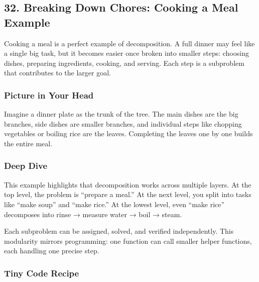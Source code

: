 \documentclass[
  letterpaper,
  DIV=11,
  numbers=noendperiod]{scrreprt}
\begin{document}
\subsection{32. Breaking Down Chores: Cooking a Meal
Example}\label{breaking-down-chores-cooking-a-meal-example}

Cooking a meal is a perfect example of decomposition. A full dinner may
feel like a single big task, but it becomes easier once broken into
smaller steps: choosing dishes, preparing ingredients, cooking, and
serving. Each step is a subproblem that contributes to the larger goal.

\subsubsection{Picture in Your Head}\label{picture-in-your-head-31}

Imagine a dinner plate as the trunk of the tree. The main dishes are the
big branches, side dishes are smaller branches, and individual steps
like chopping vegetables or boiling rice are the leaves. Completing the
leaves one by one builds the entire meal.

\subsubsection{Deep Dive}\label{deep-dive-1}

This example highlights that decomposition works across multiple layers.
At the top level, the problem is ``prepare a meal.'' At the next level,
you split into tasks like ``make soup'' and ``make rice.'' At the lowest
level, even ``make rice'' decomposes into rinse → measure water → boil →
steam.

Each subproblem can be assigned, solved, and verified independently.
This modularity mirrors programming: one function can call smaller
helper functions, each handling one precise step.

\subsubsection{Tiny Code Recipe}\label{tiny-code-recipe-29}
\end{document}
